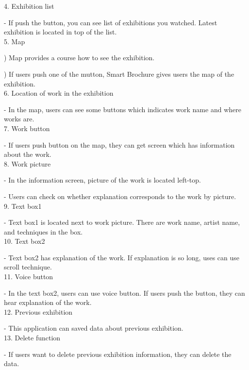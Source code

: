 \documentclass[conference]{IEEEtran}
\begin{document}
4. Exhibition list 

\quad - If push the button, you can see list of exhibitions you watched. Latest exhibition is located in top of the list.\\

5. Map

) Map provides a course how to see the exhibition.

) If users push one of the mutton, Smart Brochure gives users the map of the exhibition.\\

6. Location of work in the exhibition

\quad - In the map, users can see some buttons which indicates work name and where works are.\\

7. Work button

\quad - If users push button on the map, they can get screen which has information about the work.\\

8. Work picture

\quad - In the information screen, picture of the work is located left-top. 

\quad - Users can check on whether explanation corresponds to the work by picture.\\

9. Text box1

\quad - Text box1 is located next to work picture. There are work name, artist name, and techniques in the box.\\

10. Text box2

\quad - Text box2 has explanation of the work. If explanation is so long, uses can use scroll technique.\\

11. Voice button

\quad - In the text box2, users can use voice button. If users push the button, they can hear explanation of the work.\\

12. Previous exhibition

\quad - This application can saved data about previous exhibition.\\

13. Delete function

\quad - If users want to delete previous exhibition information, they can delete the data.\\
\end{document}
